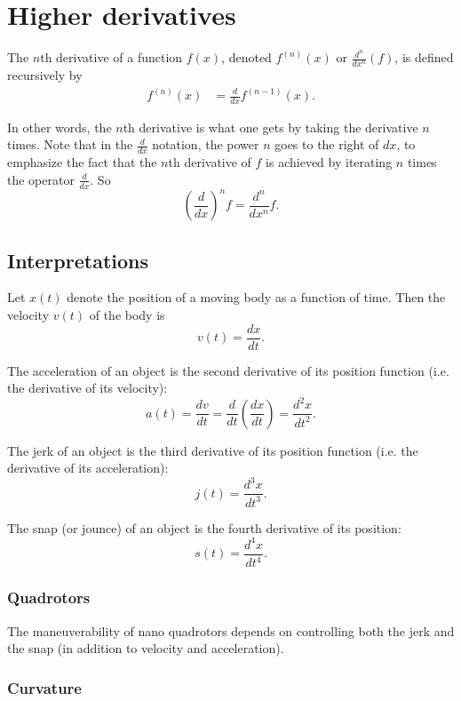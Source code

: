 \documentclass[twoside,openright,titlepage,a4paper]{book}
\begin{document}
\begin{sloppypar}
\section{Higher derivatives} \label{ChDifferentiationSecHigherDerivatives}

The $n$th derivative of a function $f(x)$, denoted $f^{\left(n\right)}(x)$ or $\frac{d^n}{dx^n}(f)$, is defined recursively by
\begin{align*}
f^{\left(n\right)}(x) &= \frac{d}{dx}f^{\left(n-1\right)}(x). 
\end{align*}

In other words, the $n$th derivative is what one gets by taking the derivative $n$ times. Note that in the $\frac{d}{dx}$ notation, the power $n$ goes to the right of $dx$, to emphasize the fact that the $n$th derivative of $f$ is achieved by iterating $n$ times the operator $\frac{d}{dx}$. So \[ \left( \frac{d}{dx}\right)^n f = \frac{d^n}{dx^n} f. \]

\subsection{Interpretations}

Let $x(t)$ denote the position of a moving body as a function of time. Then the velocity $v(t)$ of the body is \[ v(t) = \frac{dx}{dt}. \]

The acceleration of an object is the second derivative of its position function (i.e. the derivative of its velocity): \[ a(t) = \frac{dv}{dt} = \frac{d}{dt}\left(\frac{dx}{dt}\right) = \frac{d^2x}{dt^2}. \]

The jerk of an object is the third derivative of its position function (i.e. the derivative of its acceleration): \[ j(t) = \frac{d^3x}{dt^3}. \]

The snap (or jounce) of an object is the fourth derivative of its position: \[ s(t) = \frac{d^4x}{dt^4}. \]

\subsubsection{Quadrotors}

The maneuverability of nano quadrotors depends on controlling both the jerk and the snap (in addition to velocity and acceleration).

\subsubsection{Curvature}


\end{sloppypar}
\end{document}
